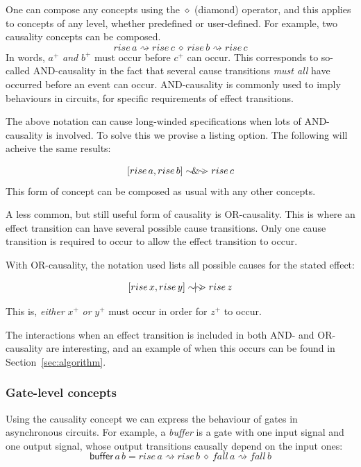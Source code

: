 \documentclass[british,conference,compsoc]{IEEEtran}
\begin{document}
One can compose any concepts using the $\diamond$ (diamond) operator, and this applies
to concepts of any level, whether predefined or user-defined. For example, 
two causality concepts can be composed.
\[
rise\,a\rightsquigarrow rise\,c\ \diamond\ rise\,b\rightsquigarrow rise\,c
\]
In words, $a^{+}$ \emph{and} $b^{+}$ must occur before $c^{+}$ can occur. 
This corresponds to so-called AND-causality in the fact that several cause transitions \emph{must all}
have occurred before an event can occur. AND-causality is commonly used
to imply behaviours in circuits, for specific requirements of effect transitions.  

The above notation can cause long-winded specifications when lots of AND-causality is involved. 
To solve this we provise a listing option. The following will acheive the same results:


\[
[rise\,a, rise\,b]\sim\hspace{-1.5mm}\&\hspace{-1.5mm}\sim\hspace{-1.5mm}>rise\,c
\]
This form of concept can be composed as usual with any other concepts.

A less common, but still useful form of causality is OR-causality. This is where an effect transition
can have several possible cause transitions. Only one cause transition is required to occur to allow
the effect transition to occur. 

With OR-causality, the notation used lists all possible causes for the stated effect:


\[
[rise\,x, rise\,y]\sim\hspace{-1.5mm}|\hspace{-1.5mm}\sim\hspace{-1.5mm}>rise\,z
\]

This is, \emph{either} $x^{+}$ \emph{or} $y^{+}$ must occur in order for 
$z^{+}$ to occur.

The interactions when an effect transition is included in both AND- and OR-causality are interesting, and
an example of when this occurs can be found in Section~\ref{sec:algorithm}.

\subsubsection{Gate-level concepts} Using the causality concept we can express
the behaviour of gates in asynchronous circuits. For example, a \emph{buffer}
is a gate with one input signal and one output signal,
whose output transitions causally depend on the input ones:
\[
\mathsf{buffer}\,a\,b=rise\,a\rightsquigarrow rise\,b\ \diamond\
fall\,a\rightsquigarrow fall\,b
\]
\end{document}
